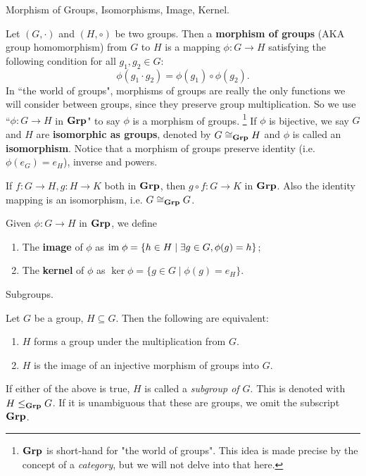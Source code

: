 \documentclass[../book.tex]{subfiles}
\begin{document}
\begin{dfn} Morphism of Groups, Isomorphisms, Image, Kernel. 

Let $(G,\cdot)$ and $(H,\circ)$ be two groups. 
Then a \textbf{morphism of groups} (AKA group homomorphism) from $G$ to $H$ is a mapping $\phi : G \to H$ 
satisfying the following condition for all $g_1, g_2 \in G$:
\[\phi(g_1 \cdot g_2)=\phi(g_1) \circ \phi(g_2).\]
In ``the world of groups", 
morphisms of groups are really the only functions we will consider between groups,
since they preserve group multiplication. 
So we use ``$\phi : G \to H$ in $\mathbf{Grp}$" to say $\phi$ is a morphism of groups. 
\footnote{$\mathbf{Grp}$ is short-hand for "the world of groups".
    This idea is made precise by the concept of a \emph{category},
    but we will not delve into that here. 
}
If $\phi$ is bijective, we say $G$ and $H$ are \textbf{isomorphic as groups}, 
denoted by $G \cong_{\mathbf{Grp}} H$ and $\phi$ is called an \textbf{isomorphism}. 
Notice that a morphism of groups preserve identity (i.e. $\phi(e_G)=e_H$), 
inverse and powers.

If $f:G \to H, g: H \to K$ both in $\mathbf{Grp}$, then $g \circ f: G \to K$ in $\mathbf{Grp}$. 
Also the identity mapping is an isomorphism, i.e. $G \cong_{\mathbf{Grp}} G$.

Given $\phi: G \to H$ in $\mathbf{Grp}$, we define
\begin{enumerate}
    \item The \textbf{image} of $\phi$ as 
        $\textnormal{im}\; \phi=\{h \in H \mid \exists g \in G, \phi(g)=h\}$;
    \item The \textbf{kernel} of $\phi$ as 
        $\ker \phi=\{g \in G \mid \phi(g)=e_H\}$.
\end{enumerate}
\end{dfn}


\begin{dfn} Subgroups. 

    Let $G$ be a group, $H \subseteq G$.
    Then the following are equivalent: 
    \begin{enumerate}
        \item $H$ forms a group under the multiplication from $G$. 
        \item $H$ is the image of an injective morphism of groups into $G$. 
    \end{enumerate}
    If either of the above is true, $H$ is called a \emph{subgroup of $G$}.
    This is denoted with $H \leq_{\mathbf{Grp}} G$. 
    If it is unambiguous that these are groups,
    we omit the subscript $\mathbf{Grp}$. 
    
\end{dfn}
\end{document}
